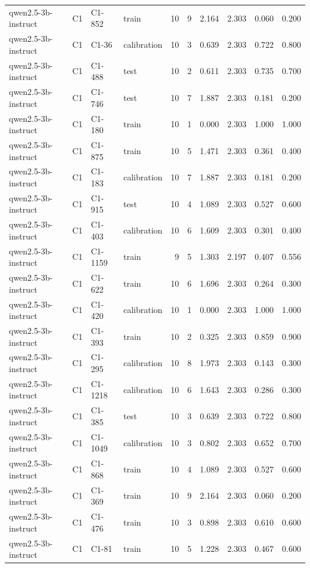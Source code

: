 \begin{table}
\begin{tabular}{llllrrrrrr}
qwen2.5-3b-instruct & C1 & C1-852 & train & 10 & 9 & 2.164 & 2.303 & 0.060 & 0.200 \\
qwen2.5-3b-instruct & C1 & C1-36 & calibration & 10 & 3 & 0.639 & 2.303 & 0.722 & 0.800 \\
qwen2.5-3b-instruct & C1 & C1-488 & test & 10 & 2 & 0.611 & 2.303 & 0.735 & 0.700 \\
qwen2.5-3b-instruct & C1 & C1-746 & test & 10 & 7 & 1.887 & 2.303 & 0.181 & 0.200 \\
qwen2.5-3b-instruct & C1 & C1-180 & train & 10 & 1 & 0.000 & 2.303 & 1.000 & 1.000 \\
qwen2.5-3b-instruct & C1 & C1-875 & train & 10 & 5 & 1.471 & 2.303 & 0.361 & 0.400 \\
qwen2.5-3b-instruct & C1 & C1-183 & calibration & 10 & 7 & 1.887 & 2.303 & 0.181 & 0.200 \\
qwen2.5-3b-instruct & C1 & C1-915 & test & 10 & 4 & 1.089 & 2.303 & 0.527 & 0.600 \\
qwen2.5-3b-instruct & C1 & C1-403 & calibration & 10 & 6 & 1.609 & 2.303 & 0.301 & 0.400 \\
qwen2.5-3b-instruct & C1 & C1-1159 & train & 9 & 5 & 1.303 & 2.197 & 0.407 & 0.556 \\
qwen2.5-3b-instruct & C1 & C1-622 & train & 10 & 6 & 1.696 & 2.303 & 0.264 & 0.300 \\
qwen2.5-3b-instruct & C1 & C1-420 & calibration & 10 & 1 & 0.000 & 2.303 & 1.000 & 1.000 \\
qwen2.5-3b-instruct & C1 & C1-393 & train & 10 & 2 & 0.325 & 2.303 & 0.859 & 0.900 \\
qwen2.5-3b-instruct & C1 & C1-295 & calibration & 10 & 8 & 1.973 & 2.303 & 0.143 & 0.300 \\
qwen2.5-3b-instruct & C1 & C1-1218 & calibration & 10 & 6 & 1.643 & 2.303 & 0.286 & 0.300 \\
qwen2.5-3b-instruct & C1 & C1-385 & test & 10 & 3 & 0.639 & 2.303 & 0.722 & 0.800 \\
qwen2.5-3b-instruct & C1 & C1-1049 & calibration & 10 & 3 & 0.802 & 2.303 & 0.652 & 0.700 \\
qwen2.5-3b-instruct & C1 & C1-868 & train & 10 & 4 & 1.089 & 2.303 & 0.527 & 0.600 \\
qwen2.5-3b-instruct & C1 & C1-369 & train & 10 & 9 & 2.164 & 2.303 & 0.060 & 0.200 \\
qwen2.5-3b-instruct & C1 & C1-476 & train & 10 & 3 & 0.898 & 2.303 & 0.610 & 0.600 \\
qwen2.5-3b-instruct & C1 & C1-81 & train & 10 & 5 & 1.228 & 2.303 & 0.467 & 0.600 \\

\end{tabular}
\end{table}
